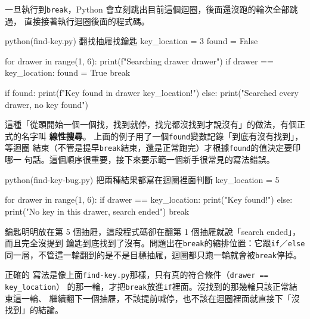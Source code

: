 一旦執行到\texttt{break}，Python 會立刻跳出目前這個迴圈，後面還沒跑的輪次全部跳過，
直接接著執行迴圈後面的程式碼。

\begin{example}{python}{(find-key.py) 翻找抽屜找鑰匙}
key_location = 3
found = False

for drawer in range(1, 6):
    print(f"Searching drawer {drawer}")
    if drawer == key_location:
        found = True
        break

if found:
    print(f"Key found in drawer {key_location}!")
else:
    print("Searched every drawer, no key found")
\end{example}


這種「從頭開始一個一個找，找到就停，找完都沒找到才說沒有」的做法，有個正式的名字叫
\textbf{線性搜尋}。
上面的例子用了一個\texttt{found}變數記錄「到底有沒有找到」，等迴圈
結束（不管是提早\texttt{break}結束，還是正常跑完）才根據\texttt{found}的值決定要印哪一
句話。這個順序很重要，接下來要示範一個新手很常見的寫法錯誤。

\begin{example}{python}{(find-key-bug.py) 把兩種結果都寫在迴圈裡面判斷}
key_location = 5

for drawer in range(1, 6):
    if drawer == key_location:
        print("Key found!")
    else:
        print("No key in this drawer, search ended")
    break
\end{example}


鑰匙明明放在第 5 個抽屜，這段程式碼卻在翻第 1 個抽屜就說「search ended」，而且完全沒提到
鑰匙到底找到了沒有。問題出在\texttt{break}的縮排位置：它跟\texttt{if}／\texttt{else}
同一層，不管這一輪翻到的是不是目標抽屜，迴圈都只跑一輪就會被\texttt{break}停掉。

正確的
寫法是像上面\texttt{find-key.py}那樣，只有真的符合條件（\texttt{drawer == key\_location}）
的那一輪，才把\texttt{break}放進\texttt{if}裡面。沒找到的那幾輪只該正常結束這一輪、
繼續翻下一個抽屜，不該提前喊停，也不該在迴圈裡面就直接下「沒找到」的結論。


